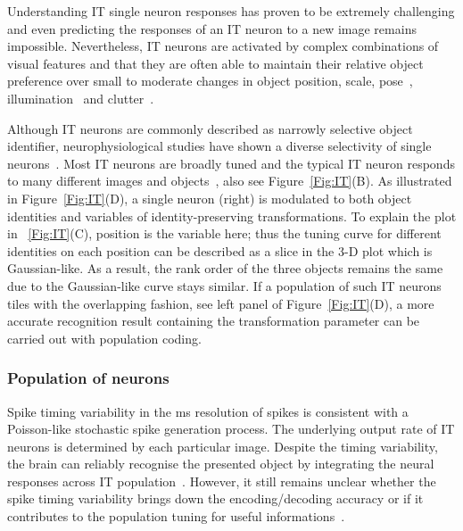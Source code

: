 Understanding IT single neuron responses has proven to be extremely challenging and even predicting the responses of an IT neuron to a new image remains impossible.
Nevertheless, IT neurons are activated by complex combinations of visual features and that they are often able to maintain their relative object preference over small to moderate changes in object position, scale, pose~\cite{logothetis1996visual}, illumination~\cite{vogels2002effects} and clutter~\cite{zoccolan2005multiple}.

Although IT neurons are commonly described as narrowly selective object identifier, neurophysiological studies have shown a diverse selectivity of single neurons~\cite{desimone1984stimulus}.
Most IT neurons are broadly tuned and the typical IT neuron responds to many different images and objects~\cite{zoccolan2007trade}, also see Figure~\ref{Fig:IT}(B).
As illustrated in Figure~\ref{Fig:IT}(D), a single neuron (right) is modulated to both object identities and variables of identity-preserving transformations.
To explain the plot in ~\ref{Fig:IT}(C), position is the variable here; thus the tuning curve for different identities on each position can be described as a slice in the 3-D plot which is Gaussian-like.
As a result, the rank order of the three objects remains the same due to the Gaussian-like curve stays similar.
If a population of such IT neurons tiles with the overlapping fashion, see left panel of Figure~\ref{Fig:IT}(D), a more accurate recognition result containing the transformation parameter can be carried out with population coding.

\subsubsection{Population of neurons}

Spike timing variability in the ms resolution of spikes is consistent with a Poisson-like stochastic spike generation process.
The underlying output rate of IT neurons is determined by each particular image.
Despite the timing variability, the brain can reliably recognise the presented object by integrating the neural responses across IT population~\cite{de2007properties}.
However, it still remains unclear whether the spike timing variability brings down the encoding/decoding accuracy or if it contributes to the population tuning for useful informations~\cite{ermentrout2008reliability}. 

